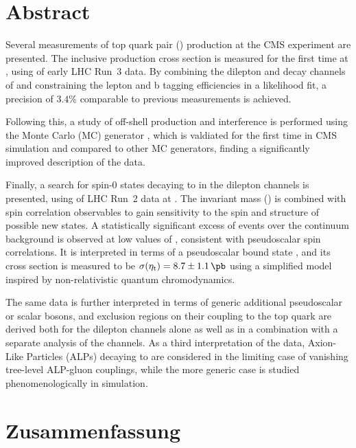 \cleardoublepage %
\chapter*{Abstract}

Several measurements of top quark pair (\ttbar) production at the CMS experiment are presented. The inclusive \ttbar production cross section \sigmatt is measured for the first time at \sqrtsRIII, using \lumiRIII of early LHC Run~3 data. By combining the dilepton and \ljets decay channels of \ttbar and constraining the lepton and b tagging efficiencies in a likelihood fit, a precision of $3.4\%$ comparable to previous \sigmatt measurements is achieved.

Following this, a study of off-shell \ttbar production and \tttW interference is performed using the Monte Carlo (MC) generator \bbfourl, which is valdiated for the first time in CMS simulation and compared to other MC generators, finding a significantly improved description of the data.

Finally, a search for spin-0 states decaying to \ttbar in the dilepton channels is presented, using \lumiRII of LHC Run~2 data at \sqrtsRII. The invariant \ttbar mass (\mtt) is combined with spin correlation observables to gain sensitivity to the spin and \CP structure of possible new states. A statistically significant excess of events over the \ttbar continuum background is observed at low values of \mtt, consistent with pseudoscalar spin correlations. It is interpreted in terms of a pseudoscalar \ttbar bound state \etat, and its cross section is measured to be $\sigetat =  8.7 \pm 1.1  \, \si{\pb}$ using a simplified model inspired by non-relativistic quantum chromodynamics. 

The same data is further interpreted in terms of generic additional pseudoscalar or scalar bosons, and exclusion regions on their coupling to the top quark are derived both for the dilepton channels alone as well as in a combination with a separate analysis of the \ljets channels. As a third interpretation of the data, Axion-Like Particles (ALPs) decaying to \ttbar are considered in the limiting case of vanishing tree-level ALP-gluon couplings, while the more generic case is studied phenomenologically in simulation.

\cleardoublepage %
\chapter*{Zusammenfassung}

